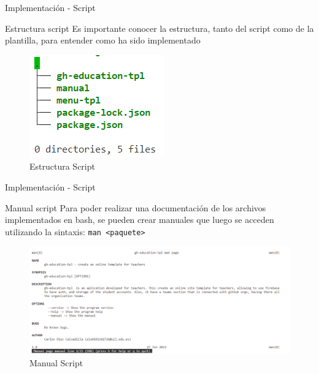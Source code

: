 \documentclass{beamer}
\begin{document}
    \begin{frame}{Implementación - Script}

        \begin{block}{Estructura script}
            Es importante conocer la estructura, tanto del script como de la plantilla, para entender como ha sido implementado
            
        \end{block}

        \begin{center} 
            \begin{figure}
                \includegraphics[width=.45\textwidth]{Presentacion/implementacion/script-structure.png}
                \caption{Estructura Script}
            \end{figure}
        \end{center}
        
        
    \end{frame}  

    \begin{frame}{Implementación - Script}
    
        \begin{block}{Manual script}
            Para poder realizar una documentación de los archivos implementados en bash, se pueden crear manuales que luego se acceden utilizando la sintaxis: {\tt man <paquete>}
            
        \end{block}

        \begin{center}  
            \begin{figure}
                \includegraphics[width=.9\textwidth]{Presentacion/implementacion/script/manual.png}
                \caption{Manual Script}
            \end{figure}            
        \end{center}
        
        
    \end{frame}  
\end{document}
